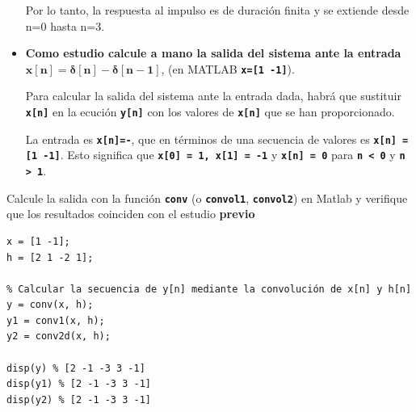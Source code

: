 \documentclass[12pt]{article}
\newcommand{\code}[1]{\texttt{\textbf{#1}}}
\begin{document}
\begin{itemize}
	Por lo tanto, la respuesta al impulso es de duración finita y se extiende desde n=0 hasta n=3.
	\item \textbf{Como estudio calcule a mano la salida del sistema ante la entrada $\mathbf{x[n]=\delta[n]-\delta[n-1]}$}, (en MATLAB \code{x=[1 -1]}).
	
	Para calcular la salida del sistema ante la entrada dada, habrá que sustituir \code{x[n]} en la ecución \code{y[n]} con los valores de \code{x[n]} que se han proporcionado.
	
	La entrada es \code{x[n]=\textdelta[n]-\textdelta[n-1]}, que en términos de una secuencia de valores es \code{x[n] = [1 -1]}. Esto significa que \code{x[0] = 1, x[1] = -1} y \code{x[n] = 0} para \code{n < 0} y \code{n > 1}.
\end{itemize}
Calcule la salida con la función \code{conv} (o \code{convol1}, \code{convol2}) en Matlab y verifique que los
resultados coinciden con el estudio \textbf{previo}

\begin{lstlisting}
x = [1 -1];
h = [2 1 -2 1];

% Calcular la secuencia de y[n] mediante la convolución de x[n] y h[n]
y = conv(x, h);
y1 = conv1(x, h);
y2 = conv2d(x, h);

disp(y) % [2 -1 -3 3 -1]
disp(y1) % [2 -1 -3 3 -1]
disp(y2) % [2 -1 -3 3 -1]
\end{lstlisting}
\end{document}
